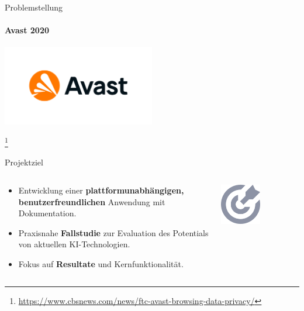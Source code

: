 \documentclass[
    ngerman,%
    authorontitle=true,
]{bfhbeamer}
\begin{document}
    \begin{frame}{Problemstellung}
        \framesubtitle{Avast 2020}
        \begin{center}
            \includegraphics[width=0.5\textwidth]{assets/presentation/avast-logo}
        \end{center}
        \footnote{\url{https://www.cbsnews.com/news/ftc-avast-browsing-data-privacy/}}
    \end{frame}

    \begin{frame}{Projektziel}
        \begin{columns}
            \begin{column}{0.7\textwidth}
                \begin{itemize}
                    \item Entwicklung einer \textbf{plattformunabh\"angigen, benutzerfreundlichen} Anwendung mit Dokumentation.
                    \item Praxisnahe \textbf{Fallstudie} zur Evaluation des Potentials von aktuellen KI-Technologien.
                    \item Fokus auf \textbf{Resultate} und Kernfunktionalit\"at.
                \end{itemize}
            \end{column}
            \begin{column}{0.3\textwidth}
                \begin{center}
                    \includegraphics[width=0.5\textwidth]{assets/presentation/target}
                \end{center}
            \end{column}
        \end{columns}
    \end{frame}
\end{document}
